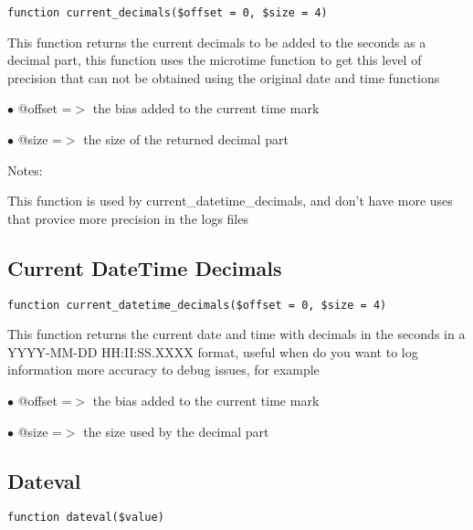 \documentclass[a4paper]{book}
\begin{document}
\begin{lstlisting}
function current_decimals($offset = 0, $size = 4)
\end{lstlisting}

This function returns the current decimals to be added to the seconds as a
decimal part, this function uses the microtime function to get this level of
precision that can not be obtained using the original date and time functions

\begin{compactitem}
\item[\color{myblue}$\bullet$] @offset =$>$ the bias added to the current time mark
\item[\color{myblue}$\bullet$] @size   =$>$ the size of the returned decimal part
\end{compactitem}

Notes:

This function is used by current\_datetime\_decimals, and don't have more uses
that provice more precision in the logs files

\hypertarget{toc78}{}
\subsection{Current DateTime Decimals}

\begin{lstlisting}
function current_datetime_decimals($offset = 0, $size = 4)
\end{lstlisting}

This function returns the current date and time with decimals in the seconds
in a YYYY-MM-DD HH:II:SS.XXXX format, useful when do you want to log information
more accuracy to debug issues, for example

\begin{compactitem}
\item[\color{myblue}$\bullet$] @offset =$>$ the bias added to the current time mark
\item[\color{myblue}$\bullet$] @size   =$>$ the size used by the decimal part
\end{compactitem}

\hypertarget{toc79}{}
\subsection{Dateval}

\begin{lstlisting}
function dateval($value)
\end{lstlisting}
\end{document}
